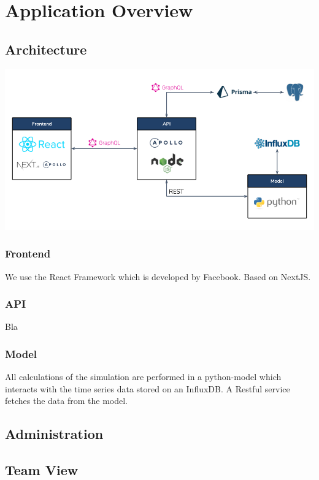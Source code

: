 \section{Application Overview}


\subsection{Architecture}

\begin{center}
  \includegraphics[scale=0.45]{img/architecture.png}
\end{center}

\subsubsection{Frontend}
We use the React Framework which is developed by Facebook. Based on NextJS.

\subsubsection{API}
Bla


\subsubsection{Model}
All calculations of the simulation are performed in a python-model which interacts with the time series data stored on an InfluxDB. A Restful service fetches the data from the model.

\subsection{Administration}

\subsection{Team View}
